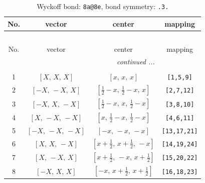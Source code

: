 \documentclass[fleqn,8pt]{jsarticle}
\begin{document}
\begin{longtable}{cccc}
\caption{Wyckoff bond: {\tt 8a@8e}, bond symmetry: {\tt .3.}}
 \\
 \hline \hline
No. & vector & center & mapping \\ \hline \endfirsthead

\multicolumn{3}{l}{\tablename\ \thetable{}} \\
 \hline \hline
No. & vector & center & mapping \\ \hline \endhead

 \hline \hline
\multicolumn{3}{r}{\footnotesize\it continued ...} \\ \endfoot

 \hline \hline
\multicolumn{3}{r}{} \\ \endlastfoot

1 & $\left[ X,\, X,\, X \right]$ & $\left[ x,\, x,\, x \right]$ & {\tt [1,5,9]} \\ \hline
2 & $\left[ - X,\, - X,\, X \right]$ & $\left[ \frac{1}{2} - x,\, \frac{1}{2} - x,\, x \right]$ & {\tt [2,7,12]} \\ \hline
3 & $\left[ - X,\, X,\, - X \right]$ & $\left[ \frac{1}{2} - x,\, x,\, \frac{1}{2} - x \right]$ & {\tt [3,8,10]} \\ \hline
4 & $\left[ X,\, - X,\, - X \right]$ & $\left[ x,\, \frac{1}{2} - x,\, \frac{1}{2} - x \right]$ & {\tt [4,6,11]} \\ \hline
5 & $\left[ - X,\, - X,\, - X \right]$ & $\left[ - x,\, - x,\, - x \right]$ & {\tt [13,17,21]} \\ \hline
6 & $\left[ X,\, X,\, - X \right]$ & $\left[ x + \frac{1}{2},\, x + \frac{1}{2},\, - x \right]$ & {\tt [14,19,24]} \\ \hline
7 & $\left[ X,\, - X,\, X \right]$ & $\left[ x + \frac{1}{2},\, - x,\, x + \frac{1}{2} \right]$ & {\tt [15,20,22]} \\ \hline
8 & $\left[ - X,\, X,\, X \right]$ & $\left[ - x,\, x + \frac{1}{2},\, x + \frac{1}{2} \right]$ & {\tt [16,18,23]} \\
\end{longtable}
\renewcommand{\arraystretch}{1.2}
\end{document}
